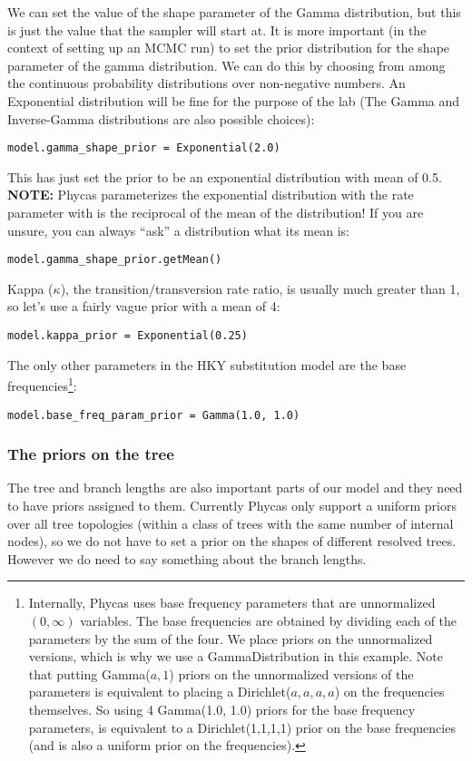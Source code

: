 \documentclass{article}
\newcommand{\phycas}{Phycas\xspace}
\begin{document}
We can set the value of the shape parameter of the Gamma distribution, but this is just the value that the sampler will start at.  
It is more important (in the context of setting up an MCMC run) to set the prior distribution for the  shape parameter of the gamma distribution.
We can do this by choosing from among the continuous probability distributions over non-negative numbers.
An Exponential distribution will be fine for the purpose of the lab (The Gamma and Inverse-Gamma distributions are also possible choices):
\begin{verbatim}
model.gamma_shape_prior = Exponential(2.0)
\end{verbatim}
This has just set the prior to be an exponential distribution with mean of 0.5.
\\{\bf NOTE:}  \phycas parameterizes the exponential distribution with the rate parameter with is the reciprocal of the mean of the distribution!
If you are unsure, you can always ``ask'' a distribution what its mean is:
\begin{verbatim}
model.gamma_shape_prior.getMean()
\end{verbatim}


Kappa ($\kappa$), the transition/transversion rate ratio, is usually much greater than 1, so let's use a fairly vague prior with a mean of 4:
\begin{verbatim}
model.kappa_prior = Exponential(0.25)
\end{verbatim}

The only other parameters in the HKY substitution model are the base frequencies\footnote{
Internally, \phycas uses base frequency parameters that are unnormalized $(0,\infty)$ variables.
The base frequencies are obtained by dividing each of the parameters by the sum of the four.
We place priors on the unnormalized versions, which is why we use a GammaDistribution in this example.
Note that putting Gamma($a,1$) priors on the unnormalized versions of the parameters is 
equivalent to placing a Dirichlet($a,a,a,a$) on the frequencies themselves.
So using 4 Gamma(1.0, 1.0) priors for the base frequency parameters, is equivalent to a Dirichlet(1,1,1,1)
prior on the base frequencies (and is also a uniform prior on the frequencies).
}:
\begin{verbatim}
model.base_freq_param_prior = Gamma(1.0, 1.0)
\end{verbatim}

\subsubsection{The priors on the tree}
The tree and branch lengths are also important parts of our model and they need to have
priors assigned to them.
Currently \phycas only support a uniform priors over all tree topologies (within a
class of trees with the same number of internal nodes), so we do not have to set
a prior on the shapes of different resolved trees.
However we do need to say something about the branch lengths.
\end{document}
